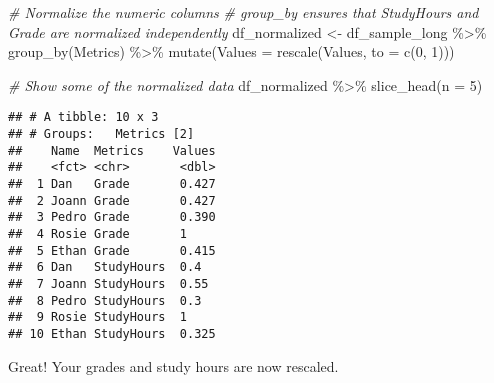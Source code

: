 \documentclass[
]{article}
\newenvironment{Shaded}{\begin{snugshade}}{\end{snugshade}}
\newcommand{\AttributeTok}[1]{\textcolor[rgb]{0.77,0.63,0.00}{#1}}
\newcommand{\CommentTok}[1]{\textcolor[rgb]{0.56,0.35,0.01}{\textit{#1}}}
\newcommand{\DecValTok}[1]{\textcolor[rgb]{0.00,0.00,0.81}{#1}}
\newcommand{\FunctionTok}[1]{\textcolor[rgb]{0.00,0.00,0.00}{#1}}
\newcommand{\NormalTok}[1]{#1}
\newcommand{\OtherTok}[1]{\textcolor[rgb]{0.56,0.35,0.01}{#1}}
\newcommand{\SpecialCharTok}[1]{\textcolor[rgb]{0.00,0.00,0.00}{#1}}
\begin{document}
\begin{Shaded}
\begin{Highlighting}[]
\CommentTok{\# Normalize the numeric columns}
\CommentTok{\# group\_by ensures that StudyHours and Grade are normalized independently}
\NormalTok{df\_normalized }\OtherTok{\textless{}{-}}\NormalTok{ df\_sample\_long }\SpecialCharTok{\%\textgreater{}\%} 
  \FunctionTok{group\_by}\NormalTok{(Metrics) }\SpecialCharTok{\%\textgreater{}\%} 
  \FunctionTok{mutate}\NormalTok{(}\AttributeTok{Values =} \FunctionTok{rescale}\NormalTok{(Values, }\AttributeTok{to =} \FunctionTok{c}\NormalTok{(}\DecValTok{0}\NormalTok{, }\DecValTok{1}\NormalTok{)))}

\CommentTok{\# Show some of the normalized data}
\NormalTok{df\_normalized }\SpecialCharTok{\%\textgreater{}\%} 
  \FunctionTok{slice\_head}\NormalTok{(}\AttributeTok{n =} \DecValTok{5}\NormalTok{)}
\end{Highlighting}
\end{Shaded}

\begin{verbatim}
## # A tibble: 10 x 3
## # Groups:   Metrics [2]
##    Name  Metrics    Values
##    <fct> <chr>       <dbl>
##  1 Dan   Grade       0.427
##  2 Joann Grade       0.427
##  3 Pedro Grade       0.390
##  4 Rosie Grade       1    
##  5 Ethan Grade       0.415
##  6 Dan   StudyHours  0.4  
##  7 Joann StudyHours  0.55 
##  8 Pedro StudyHours  0.3  
##  9 Rosie StudyHours  1    
## 10 Ethan StudyHours  0.325
\end{verbatim}

Great! Your grades and study hours are now rescaled.
\end{document}
